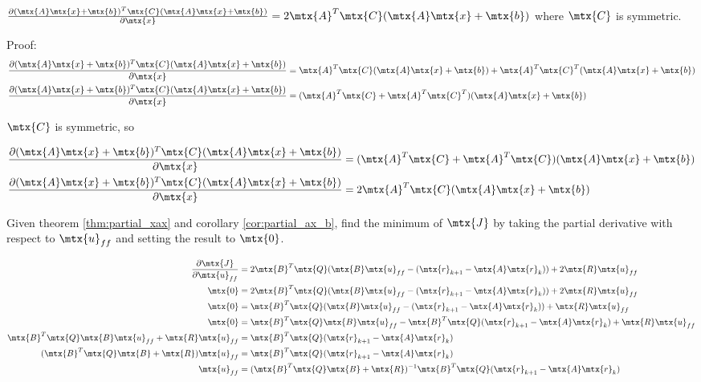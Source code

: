 \begin{corollary}
  \label{cor:partial_ax_b}

  $\frac{\partial (\mtx{A}\mtx{x} + \mtx{b})^T\mtx{C}
    (\mtx{A}\mtx{x} + \mtx{b})}{\partial\mtx{x}} =
    2\mtx{A}^T\mtx{C}(\mtx{A}\mtx{x} + \mtx{b})$ where $\mtx{C}$ is symmetric.

  Proof:
  \begin{align*}
    \frac{\partial (\mtx{A}\mtx{x} + \mtx{b})^T\mtx{C}
      (\mtx{A}\mtx{x} + \mtx{b})}{\partial\mtx{x}} &=
      \mtx{A}^T\mtx{C}(\mtx{A}\mtx{x} + \mtx{b}) + \mtx{A}^T\mtx{C}^T
      (\mtx{A}\mtx{x} + \mtx{b}) \\
    \frac{\partial (\mtx{A}\mtx{x} + \mtx{b})^T\mtx{C}
      (\mtx{A}\mtx{x} + \mtx{b})}{\partial\mtx{x}} &=
      (\mtx{A}^T\mtx{C} + \mtx{A}^T\mtx{C}^T)(\mtx{A}\mtx{x} + \mtx{b})
  \end{align*}

  $\mtx{C}$ is symmetric, so

  \begin{align*}
    \frac{\partial (\mtx{A}\mtx{x} + \mtx{b})^T\mtx{C}
      (\mtx{A}\mtx{x} + \mtx{b})}{\partial\mtx{x}} &=
      (\mtx{A}^T\mtx{C} + \mtx{A}^T\mtx{C})(\mtx{A}\mtx{x} + \mtx{b}) \\
    \frac{\partial (\mtx{A}\mtx{x} + \mtx{b})^T\mtx{C}
      (\mtx{A}\mtx{x} + \mtx{b})}{\partial\mtx{x}} &=
      2\mtx{A}^T\mtx{C}(\mtx{A}\mtx{x} + \mtx{b})
  \end{align*}
\end{corollary}

Given theorem \ref{thm:partial_xax} and corollary \ref{cor:partial_ax_b}, find
the minimum of $\mtx{J}$ by taking the partial derivative with respect to
$\mtx{u}_{ff}$ and setting the result to $\mtx{0}$.

\begin{align*}
  \frac{\partial\mtx{J}}{\partial\mtx{u}_{ff}} &= 2\mtx{B}^T\mtx{Q}
    (\mtx{B}\mtx{u}_{ff} - (\mtx{r}_{k+1} - \mtx{A}\mtx{r}_k)) +
    2\mtx{R}\mtx{u}_{ff} \\
  \mtx{0} &= 2\mtx{B}^T\mtx{Q}
    (\mtx{B}\mtx{u}_{ff} - (\mtx{r}_{k+1} - \mtx{A}\mtx{r}_k)) +
    2\mtx{R}\mtx{u}_{ff} \\
  \mtx{0} &= \mtx{B}^T\mtx{Q}
    (\mtx{B}\mtx{u}_{ff} - (\mtx{r}_{k+1} - \mtx{A}\mtx{r}_k)) +
    \mtx{R}\mtx{u}_{ff} \\
  \mtx{0} &= \mtx{B}^T\mtx{Q}\mtx{B}\mtx{u}_{ff} -
    \mtx{B}^T\mtx{Q}(\mtx{r}_{k+1} - \mtx{A}\mtx{r}_k) + \mtx{R}\mtx{u}_{ff} \\
  \mtx{B}^T\mtx{Q}\mtx{B}\mtx{u}_{ff} + \mtx{R}\mtx{u}_{ff} &=
    \mtx{B}^T\mtx{Q}(\mtx{r}_{k+1} - \mtx{A}\mtx{r}_k) \\
  (\mtx{B}^T\mtx{Q}\mtx{B} + \mtx{R})\mtx{u}_{ff} &=
    \mtx{B}^T\mtx{Q}(\mtx{r}_{k+1} - \mtx{A}\mtx{r}_k) \\
  \mtx{u}_{ff} &= (\mtx{B}^T\mtx{Q}\mtx{B} + \mtx{R})^{-1}
    \mtx{B}^T\mtx{Q}(\mtx{r}_{k+1} - \mtx{A}\mtx{r}_k)
\end{align*}

